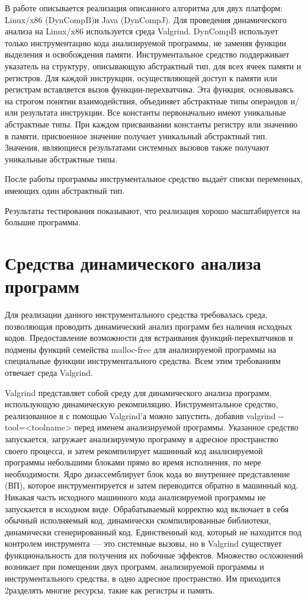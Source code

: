 \documentclass[a4paper,12pt,russian]{article}
\newcommand{\code}[1]{\textsf{#1}}
\begin{document}
В работе описывается реализация описанного алгоритма для двух платформ: \code{Linux/x86} (\code{DynCompB})и \code{Java} (\code{DynCompJ}).
Для проведения динамического анализа на \code{Linux/x86} используется среда \code{Valgrind}.
\code{DynCompB} использует только инструментацию кода анализируемой программы, не заменяя функции выделения и освобождения памяти.
Инструментальное средство поддерживает указатель на структуру, описывающую абстрактный тип, для всех ячеек памяти и регистров.
Для каждой инструкции, осуществляющей доступ к памяти или регистрам вставляется вызов функции-перехватчика.
Эта функция, основываясь на строгом понятии взаимодействия, объединяет абстрактные типы операндов и/или результата инструкции.
Все константы первоначально имеют уникальные абстрактные типы.
При каждом присваивании константы регистру или значению в памяти, присвоенное значение получает уникальный абстрактный тип.
Значения, являющиеся результатами системных вызовов также получают уникальные абстрактные типы.

После работы программы инструментальное средство выдаёт списки переменных, имеющих один абстрактный тип.

Результаты тестирования показывают, что реализация хорошо масштабируется на большие программы.

\newpage
\section{Средства динамического анализа программ}
\label{valgrind_section}
Для реализации данного инструментального средства требовалась среда, позволяющая проводить динамический анализ программ без наличия исходных кодов.
Предоставление возможности для встраивания функций-перехватчиков и подмены функций семейства \code{malloc-free} для анализируемой программы на специальные функции инструментального средства.
Всем этим требованиям отвечает среда \code{Valgrind}.

\code{Valgrind} представляет собой среду для динамического анализа программ, использующую динамическую рекомпиляцию.
Инструментальное средство, реализованное в с помощью \code{Valgrind}'а можно запустить, добавив \code{valgrind -{}-tool=<toolname>} перед именем анализируемой программы. Указанное средство запускается, загружает анализируемую программу в адресное пространство своего процесса, и затем рекомпилирует машинный код анализируемой программы небольшими блоками прямо во время исполнения, по мере необходимости.
Ядро дизассемблирует блок кода во внутреннее представление (ВП), которое инструментируется и затем переводится обратно в машинный код.
Никакая часть исходного машинного кода анализируемой программы не запускается в исходном виде. Обрабатываемый корректно код включает в себя обычный исполняемый код, динамически скомпилированные библиотеки, динамически сгенерированный код. Единственный код, который не находится под контролем инструмента --- это системные вызовы, но в \code{Valgrind} существует функциональность для получения их побочные эффектов. Множество осложнений возникает при помещении двух программ, анализируемой программы и инструментального средства, в одно адресное пространство. Им приходится 2разделять многие ресурсы, такие как регистры и память.
\end{document}
